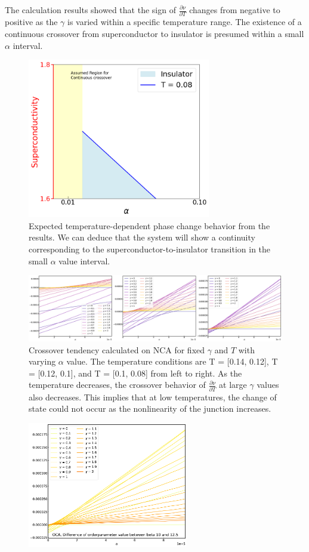 \documentclass{article}[12pt]
\begin{document}
\begin{spacing}{1.5}
  The calculation results showed that the sign of $\frac{\partial \nu}{\partial T}$ changes from negative to positive 
as the $\gamma$ is varied within a specific temperature range. The existence of a continuous crossover from superconductor 
to insulator is presumed within a small $\alpha$ interval.
\begin{figure}[H]
  \centerline{\includegraphics[width=8cm]{TexFigure/smallalp.png}}
  \caption{Expected temperature-dependent phase change behavior from the results.
  We can deduce that the system will show a continuity corresponding to the superconductor-to-insulator transition in the small $\alpha$ value interval.}
\end{figure}
\pagebreak
\vfill
\begin{figure}[H]
  \vfill
  \centerline{\includegraphics[width=17cm]{TexFigure/litlalp_1.png}}
  \caption{Crossover tendency calculated on NCA for fixed $\gamma$ and $T$ with varying $\alpha$ value. The temperature conditions are T = [0.14, 0.12], T = [0.12, 0.1], and T = [0.1, 0.08] 
  from left to right. As the temperature decreases, the crossover behavior of $\frac{\partial \nu}{\partial T}$ 
  at large $\gamma$ values also decreases. This implies that at low temperatures, the change of state could not occur 
  as the nonlinearity of the junction increases.}
\end{figure}
\begin{figure}[H]
  \centerline{\includegraphics[width=7cm]{TexFigure/Diff_Os3_b_10_12.5_n.png}}

\end{figure}
\end{spacing}
\end{document}
